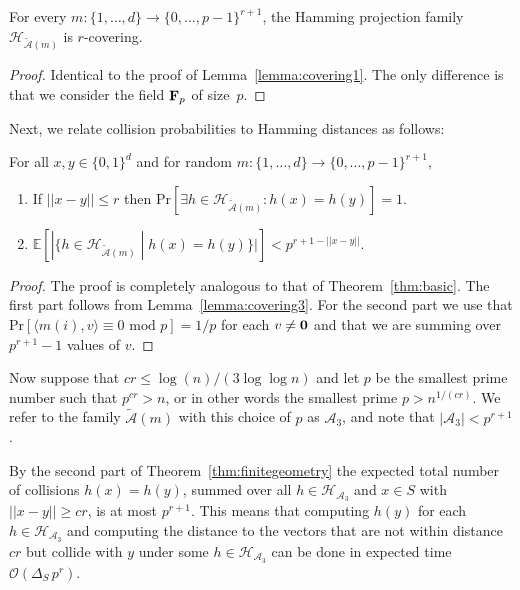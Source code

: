 \documentclass[prodmode,acmtalg]{acmsmall}
\newcommand{\Osymbol}{{\mathcal O}}
\newcommand{\BO}[1]{\Osymbol\left(#1\right)}
\newcommand{\E}[1]{\mathbb{E}\left[#1\right]}
\renewcommand{\Pr}[1]{\text{Pr}\left[#1\right]}
\begin{document}
\begin{lemma}\label{lemma:covering3}
For every $m: \{1,\dots,d\} \rightarrow \{0,\dots,p-1\}^{r+1}$, the Hamming projection family $\mathcal{H}_{\tilde{\mathcal{A}}(m)}$ is $r$-covering.
\end{lemma}
\begin{proof}
	Identical to the proof of Lemma~\ref{lemma:covering1}. The only difference is that we consider the field ${\bf F}_p$ of size~$p$.
\end{proof}



Next, we relate collision probabilities to Hamming distances as follows:
\begin{theorem}\label{thm:finitegeometry}
	For all $x,y\in \{0,1\}^d$ and for random $m: \{1,\dots,d\} \rightarrow \{0,\dots,p-1\}^{r+1}$,
	\begin{enumerate}
\item If $||x-y||\leq r$ then $\Pr{\exists h\in \mathcal{H}_{\tilde{\mathcal{A}}(m)}: h(x)=h(y)} = 1$.
\item $\E{ | \{ h\in \mathcal{H}_{\tilde{\mathcal{A}}(m)} \;|\; h(x)=h(y) \} | } < p^{r+1-||x-y||}$.
\end{enumerate}
\end{theorem}
\begin{proof}
The proof is completely analogous to that of Theorem~\ref{thm:basic}. 
The first part follows from Lemma~\ref{lemma:covering3}.
For the second part we use that $\Pr{\langle m(i),v\rangle \equiv 0 \text{ mod } p} = 1/p$ for each $v\ne{\bf 0}$ and that we are summing over $p^{r+1}-1$ values of $v$.
\end{proof}

Now suppose that $cr \leq \log(n)/(3 \log\log n)$ and let $p$ be the smallest prime number such that $p^{cr} > n$, or in other words the smallest prime $p > n^{1/(cr)}$. We refer to the family $\tilde{\mathcal{A}}(m)$ with this choice of $p$ as $\mathcal{A}_3$, and note that $|\mathcal{A}_3| < p^{r+1}$.

By the second part of Theorem~\ref{thm:finitegeometry} the expected total number of collisions $h(x)=h(y)$, summed over all $h\in \mathcal{H}_{\mathcal{A}_3}$ and $x\in S$ with $||x-y||\geq cr$, is at most $p^{r+1}$.
This means that computing $h(y)$ for each $h\in \mathcal{H}_{\mathcal{A}_3}$ and computing the distance to the vectors that are not within distance $cr$ but collide with $y$ under some $h\in \mathcal{H}_{\mathcal{A}_3}$ can be done in expected time $\BO{\Delta_S\, p^r}$.
\end{document}
